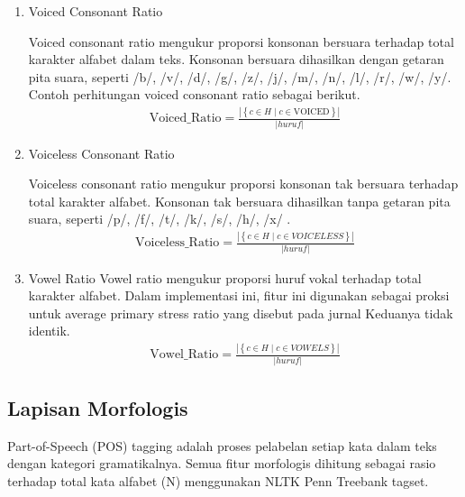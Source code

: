 \begin{enumerate}[label=\arabic*., leftmargin=*]
\item Voiced Consonant Ratio

Voiced consonant ratio mengukur proporsi konsonan bersuara terhadap total karakter alfabet dalam teks. Konsonan bersuara dihasilkan dengan getaran pita suara, seperti /b/, /v/, /d/, /g/, /z/, /j/, /m/, /n/, /l/, /r/, /w/, /y/. Contoh perhitungan voiced consonant ratio sebagai berikut.
\begin{equation}
\label{eq:1}
\begin{split}
\text{Voiced\_Ratio}=\frac{\left|\left\{c\in H\mid c\in \text{VOICED}\right\}\right|}{\left|huruf\right|}
\end{split}
\end{equation}

\item Voiceless Consonant Ratio

Voiceless consonant ratio mengukur proporsi konsonan tak bersuara terhadap total karakter alfabet. Konsonan tak bersuara dihasilkan tanpa getaran pita suara, seperti /p/, /f/, /t/, /k/, /s/, /h/, /x/ \cite{Farrell2026}.
\begin{equation}
\label{eq:2}
\begin{split}
\text{Voiceless\_Ratio}=\frac{\left|\left\{c\in H\mid c\in VOICELESS\right\}\right|}{\left|huruf\right|}
\end{split}
\end{equation}

\item Vowel Ratio
Vowel ratio mengukur proporsi huruf vokal terhadap total karakter alfabet. Dalam implementasi ini, fitur ini digunakan sebagai proksi untuk average primary stress ratio yang disebut pada jurnal \cite{Farrell2026} Keduanya tidak identik.
\begin{equation}
\label{eq:3}
\begin{split}
\text{Vowel\_Ratio}=\frac{\left|\left\{c\in H\mid c\in VOWELS\right\}\right|}{\left|huruf\right|}
\end{split}
\end{equation}

\end{enumerate}

\subsection{Lapisan Morfologis}

Part-of-Speech (POS) tagging adalah proses pelabelan setiap kata dalam teks dengan kategori gramatikalnya. Semua fitur morfologis dihitung sebagai rasio terhadap total kata alfabet (N) menggunakan NLTK Penn Treebank tagset. \cite{Jaashan2025}\cite{Irsyad2026}

